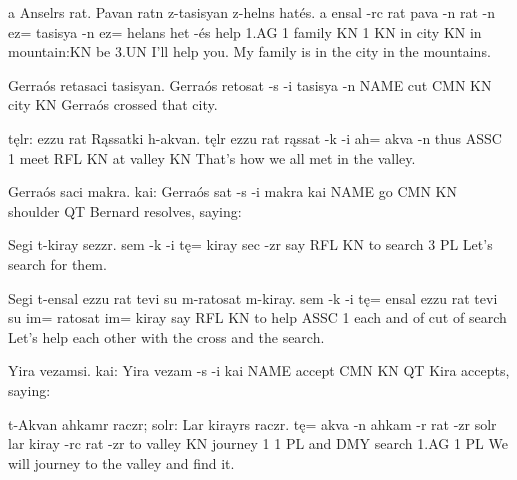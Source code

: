 \documentclass[fontsize=12pt,twoside=false,numbers=noenddot]{class/kaobook}
\newenvironment{example*}{
	\begin{minipage}{164.6mm}%
	\examples%
	\ex%
}{%
	\endexamples%
	\end{minipage}%
}%
\begin{document}
\begin{example*}
\script a Anselrs rat. Pavan ratn z-tasisyan z-helns hatés.
\bits a ensal -rc rat pava -n rat -n ez= tasisya -n ez= helans het -és
 help 1.AG 1 family KN 1 KN in city KN in mountain:KN be 3.UN
\tr I'll help you. My family is in the city in the mountains.
\end{example*}

\begin{example*}
\script Gerraós retasaci tasisyan.
\bits Gerraós retosat -s -i tasisya -n
\gloss NAME cut CMN KN city KN
\tr Gerraós crossed that city.
\end{example*}

\begin{example*}
\script tęlr: ezzu rat Rąssatki h-akvan.
\bits tęlr ezzu rat rąssat -k  -i  ah= akva -n
\gloss thus ASSC 1   meet  RFL KN at valley KN
\tr That's how we all met in the valley.
\end{example*}

\begin{example*}
\script Gerraós saci makra. kai:
\bits Gerraós sat -s  -i  makra    kai
\gloss NAME    go CMN KN shoulder QT
\tr Bernard resolves, saying:
\end{example*}

\begin{example*}
\script Segi t-kiray sezzr.
\bits sem -k  -i  tę= kiray  sec -zr
\gloss say  RFL  KN to search 3  PL
\tr Let's search for them.
\end{example*}

\begin{example*}
\script Segi t-ensal ezzu rat tevi su m-ratosat m-kiray.
\bits sem -k  -i  tę= ensal ezzu rat tevi su  im= ratosat im= kiray
\gloss say RFL KN to help  ASSC 1   each and of cut     of search
\tr Let's help each other with the cross and the search.
\end{example*}

\begin{example*}
\script Yira vezamsi. kai:
\bits Yira vezam -s  -i  kai
\gloss NAME accept CMN KN QT
\tr Kira accepts, saying:
\end{example*}

\begin{example*}
\script t-Akvan ahkamr raczr; solr: Lar kirayrs raczr.
\bits tę= akva  -n  ahkam  -r rat -zr solr lar kiray -rc   rat -zr
\gloss to valley KN journey 1 1   PL and  DMY search 1.AG 1  PL
\tr We will journey to the valley and find it.
\end{example*}
\end{document}

